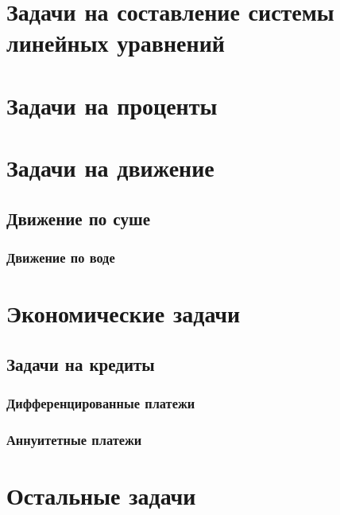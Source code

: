 \documentclass[10pt, a4paper]{article}
\begin{document}
	\section{Задачи на составление системы линейных уравнений}
	\section{Задачи на проценты}
	\section{Задачи на движение}
		\subsection{Движение по суше}
		\subsubsection{Движение по воде}
	\section{Экономические задачи}
		\subsection{Задачи на кредиты}
			\subsubsection{Дифференцированные платежи}
			\subsubsection{Аннуитетные платежи}
	\section{Остальные задачи}
\end{document}
